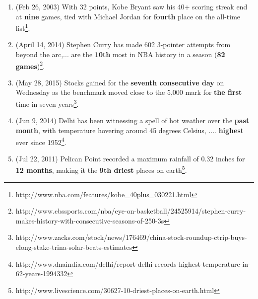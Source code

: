 

\begin{enumerate}
\setlength\itemsep{-0.05cm}
\item(Feb 26, 2003) With 32 points, Kobe Bryant saw his 40+ scoring streak end at \textbf{nine} games,  tied with Michael Jordan for \textbf{fourth} place on the all-time list\footnote{http://www.nba.com/features/kobe\_40plus\_030221.html}. 

\item(April 14, 2014) Stephen Curry has made 602 3-pointer attempts from beyond the arc,... are the \textbf{10th} most in NBA history in a season (\textbf{82 games})\footnote{http://www.cbssports.com/nba/eye-on-basketball/24525914/stephen-curry-makes-history-with-consecutive-seasons-of-250-3s}.

\item (May 28, 2015) Stocks gained for the \textbf{seventh consecutive day} on Wednesday as the benchmark moved close to the 5,000 mark for \textbf{the first} time in seven years\footnote{http://www.zacks.com/stock/news/176469/china-stock-roundup-ctrip-buys-elong-stake-trina-solar-beats-estimates}.

\item (Jun 9,  2014) Delhi has been witnessing a spell of hot weather  over the \textbf{past month}, with temperature hovering around 45 degrees Celsius, .... \textbf{highest} ever since 1952\footnote{http://www.dnaindia.com/delhi/report-delhi-records-highest-temperature-in-62-years-1994332}.

\item(Jul 22, 2011) Pelican Point recorded a maximum rainfall of 0.32 inches for \textbf{12 months}, making it the  \textbf{9th driest} places on earth\footnote{http://www.livescience.com/30627-10-driest-places-on-earth.html}.
\end{enumerate}

